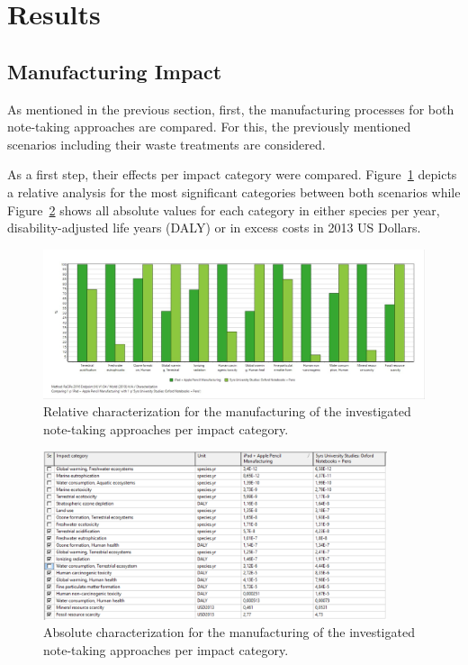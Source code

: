 \section{Results}\label{sec:results}

\subsection{Manufacturing Impact}\label{subsec:results_manufacturing}
As mentioned in the previous section, first, the manufacturing processes for both note-taking approaches are compared. For this, the previously mentioned scenarios including their waste treatments are considered. 

As a first step, their effects per impact category were compared. Figure~\ref{fig:characterization_manufacturing} depicts a relative analysis for the most significant categories between both scenarios while Figure~\ref{fig:characterization_table_manufacturing} shows all absolute values for each category in either species per year, disability-adjusted life years (DALY) or in excess costs in 2013 US Dollars.


\begin{figure}[H]
    \centering
    \includegraphics[width=\textwidth]{images/Manufacturing/Characterization_Manufacturing.JPG}
    \caption{Relative characterization for the manufacturing of the investigated note-taking approaches per impact category.}\label{fig:characterization_manufacturing}
\end{figure}

\begin{figure}[H]
    \centering
    \includegraphics[width=0.9\textwidth]{images/Manufacturing/Characterization_Table_Manufacturing.PNG}
    \caption{Absolute characterization for the manufacturing of the investigated note-taking approaches per impact category.}\label{fig:characterization_table_manufacturing}
\end{figure}

